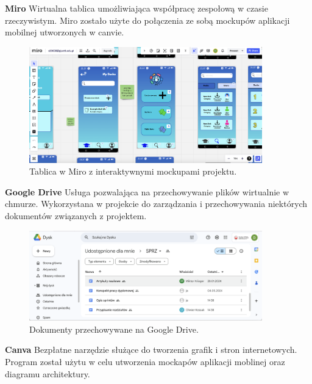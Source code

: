 \textbf{Miro} Wirtualna tablica umożliwiająca współpracę zespołową w czasie rzeczywistym. Miro zostało użyte do połączenia ze sobą mockupów aplikacji mobilnej utworzonych w canvie.

\begin{figure}[H]
    \centering
    \includegraphics[width=0.9\textwidth]{chapters/chapter_7/miro.png}
    \caption{Tablica w Miro z interaktywnymi mockupami projektu.}
    \label{img:miro}
\end{figure}


\textbf{Google Drive} Usługa pozwalająca na przechowywanie plików wirtualnie w chmurze. Wykorzystana w projekcie do zarządzania i przechowywania niektórych dokumentów związanych z projektem.

\begin{figure}[H]
    \centering
    \includegraphics[width=0.9\textwidth]{chapters/chapter_7/google_drive.png}
    \caption{Dokumenty przechowywane na Google Drive.}
    \label{img:google_drive}
\end{figure}


\textbf{Canva} Bezpłatne narzędzie służące do tworzenia grafik i stron internetowych. Program został użytu w celu utworzenia mockapów aplikacji moblinej oraz diagramu architektury.

